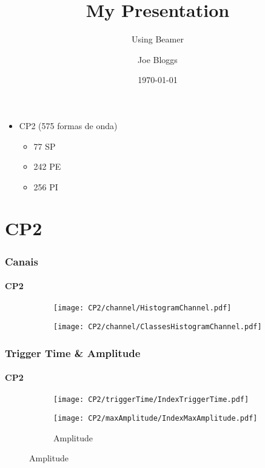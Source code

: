 \documentclass{beamer}
\begin{document}
\title{My Presentation}
\subtitle{Using Beamer}
\author{Joe Bloggs}
\date{\today}

\begin{frame}
\end{frame}

\begin{frame}
\begin{itemize}
	\item CP2 (575 formas de onda)
	\begin{itemize}
		\item 77 SP
		\item 242 PE
		\item 256 PI
	\end{itemize}

\end{itemize}

\end{frame}

\section{CP2}


\begin{frame}
\frametitle{Canais}
\framesubtitle{CP2}

\begin{figure}
	
\begin{subfigure}{.5\textwidth}
	\centering
\texttt{[image: CP2/channel/HistogramChannel.pdf]}
\end{subfigure}%
\begin{subfigure}{.5\textwidth}
	\centering
\texttt{[image: CP2/channel/ClassesHistogramChannel.pdf]}
\end{subfigure}
\end{figure}

\end{frame}

\begin{frame}
\frametitle{Trigger Time \& Amplitude}
\framesubtitle{CP2}

\begin{figure}
	
	\begin{subfigure}{.5\textwidth}
		\centering
		\texttt{[image: CP2/triggerTime/IndexTriggerTime.pdf]}
	\end{subfigure}%
	\begin{subfigure}{.5\textwidth}
		\centering
		\texttt{[image: CP2/maxAmplitude/IndexMaxAmplitude.pdf]}
		\caption{Amplitude}
	\end{subfigure}
\end{figure}

\end{frame}
\end{document}
